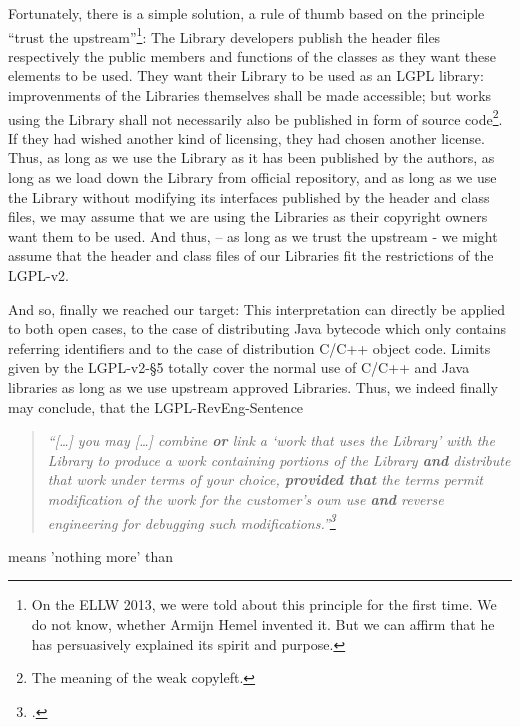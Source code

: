 Fortunately, there is a simple solution, a rule of thumb based on the principle
\enquote{trust the upstream}\footnote{On the ELLW 2013, we were told about this
principle for the first time. We do not know, whether Armijn Hemel invented it.
But we can affirm that he has persuasively explained its spirit and purpose.}:
The Library developers publish the header files respectively the public members
and functions of the classes as they want these elements to be used. They want
their Library to be used as an LGPL library: improvenments of the Libraries
themselves shall be made accessible; but works using the Library shall not
necessarily also be published in form of source code\footnote{The meaning of the
weak copyleft.}. If they had wished another kind of licensing, they had chosen
another license. Thus, as long as we use the Library as it has been published by
the authors, as long as we load down the Library from official repository, and
as long as we use the Library without modifying its interfaces published by the
header and class files, we may assume that we are using the Libraries as their
copyright owners want them to be used. And thus, -- as long as we trust the
upstream - we might assume that the header and class files of our Libraries fit
the restrictions of the LGPL-v2.

And so, finally we reached our target: This interpretation can directly be
applied to both open cases, to the case of distributing Java bytecode which only
contains referring identifiers and to the case of distribution C/C++ object
code. Limits given by the LGPL-v2-§5 totally cover the normal use of C/C++ and
Java libraries as long as we use upstream approved Libraries. Thus, we indeed
finally may conclude, that the LGPL-RevEng-Sentence

\begin{quote}\noindent\emph{\enquote{[\ldots] you may [\ldots] combine
\textbf{or} link a \enquote{work that uses the Library} with the Library to
produce a work containing portions of the Library \textbf{and} distribute that
work under terms of your choice, \textbf{provided that} the terms permit
modification of the work for the customer's own use \textbf{and} \emph{reverse
engineering} for debugging such modifications.}\footcite[cf.][\nopage wp.
emphasis KR.]{Lgpl21OsiLicense1999a}}
\end{quote}

means 'nothing more' than

